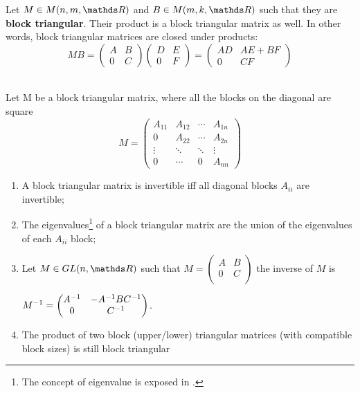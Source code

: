 \documentclass[computationalMathematics.tex]{subfiles}
\begin{document}
\begin{proposition}
  Let $M \in M(n, m, \R)$ and $B \in M(m, k, \R)$ such that they are \textbf{block triangular}.
  Their product is a block triangular matrix as well. In other words, block triangular matrices are closed under products:
  \[
  M B 
  = \begin{pmatrix}
    A & B\\
    0 & C
  \end{pmatrix}
  \begin{pmatrix}
    D & E\\
    0 & F
  \end{pmatrix}
  = 
  \begin{pmatrix}
    AD & AE + BF\\
    0 & CF
  \end{pmatrix}
\]
\end{proposition}

\begin{proposition}~\\
    Let M be a block triangular matrix, where all the blocks on the diagonal are square
   \[
     M 
      = \begin{pmatrix}
        A_{11}  & A_{12} & \cdots & A_{1n}\\
        0       & A_{22} & \cdots & A_{2n}\\
        \vdots  &\ddots & \ddots & \vdots\\
        0       & \cdots & 0 & A_{nn}
      \end{pmatrix}
    \]
    \begin{enumerate}
      \item A block triangular matrix is invertible iff all diagonal blocks $A_{ii}$ are invertible;
      \item The eigenvalues\footnote{The concept of eigenvalue is exposed in .} of a block triangular matrix are the union of the eigenvalues of each $A_{ii}$ block;
      \item Let $M \in GL(n, \R)$ such that $M= 
        \begin{pmatrix}
          A & B\\
          0 & C\\
        \end{pmatrix}$ 
       the inverse of $M$ is 
        
        ${M}^{-1} = 
        \begin{pmatrix}
          {A}^{-1} & -{A}^{-1}B{C}^{-1}\\
          0 & {C}^{-1}
        \end{pmatrix}$.
      \item The product of two block (upper/lower) triangular matrices
(with compatible block sizes) is still block triangular
    \end{enumerate}
  \end{proposition}
\end{document}
